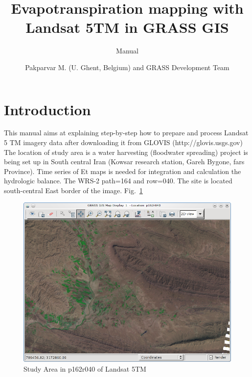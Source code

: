 %


\title{Evapotranspiration mapping with Landsat 5TM in GRASS GIS}
\subtitle{Manual}
\author{Pakparvar M. (U. Ghent, Belgium) and GRASS Development Team}

\maketitle
\section{Introduction}

This manual aims at explaining step-by-step how to prepare and process Landsat 5 TM imagery data after downloading it from GLOVIS (http://glovis.usgs.gov) The location of study area is a water harvesting (floodwater spreading) project is being set up in South central Iran (Kowsar research station, Gareh Bygone, fars Province). Time series of Et maps is needed for integration and calculation the hydrologic balance. The WRS-2 path=164 and row=040. The site is located south-central East border of the image. Fig.~\ref{fig:gipe000}\newline

\begin{figure}[htbp]
   \centering
   \includegraphics[scale=0.4]{gipe000.png}
   \caption{Study Area in p162r040 of Landsat 5TM}
   \label{fig:gipe000}
\end{figure}

